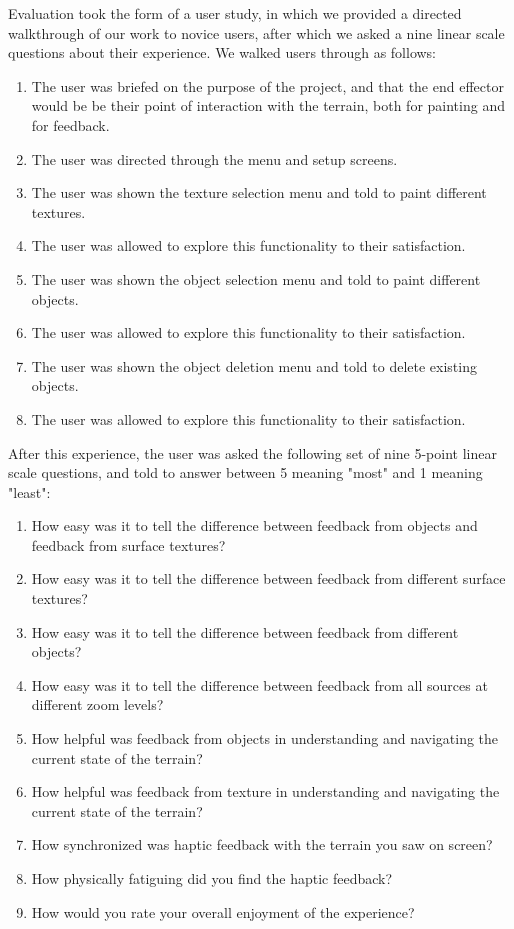 Evaluation took the form of a user study, in which we provided a directed walkthrough of our work to novice users, after which we asked a nine linear scale questions about their experience.
We walked users through as follows:

\begin{enumerate}
    \item The user was briefed on the purpose of the project, and that the end effector would be be their point of interaction with the terrain, both for painting and for feedback.
    \item The user was directed through the menu and setup screens.
    \item The user was shown the texture selection menu and told to paint different textures.
    \item The user was allowed to explore this functionality to their satisfaction.
    \item The user was shown the object selection menu and told to paint different objects.
    \item The user was allowed to explore this functionality to their satisfaction.
    \item The user was shown the object deletion menu and told to delete existing objects.
    \item The user was allowed to explore this functionality to their satisfaction.
\end{enumerate}

After this experience, the user was asked the following set of nine 5-point linear scale questions, and told to answer between 5 meaning "most" and 1 meaning "least":
\begin{enumerate}
    \item How easy was it to tell the difference between feedback from objects and feedback from surface textures?
    \item How easy was it to tell the difference between feedback from different surface textures?
    \item How easy was it to tell the difference between feedback from different objects?
    \item How easy was it to tell the difference between feedback from all sources at different zoom levels?
          \vspace{3mm}
    \item How helpful was feedback from objects in understanding and navigating the current state of the terrain?
    \item How helpful was feedback from texture in understanding and navigating the current state of the terrain?
          \vspace{3mm}
    \item How synchronized was haptic feedback with the terrain you saw on screen?
    \item How physically fatiguing did you find the haptic feedback?
    \item How would you rate your overall enjoyment of the experience?
\end{enumerate}

